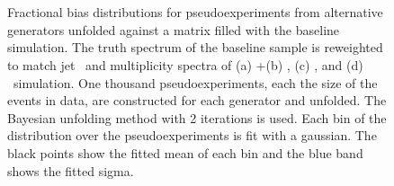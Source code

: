 \begin{figure}
~
\\
~
~
\caption{Fractional bias distributions for pseudoexperiments from alternative generators unfolded against a matrix filled with the baseline simulation. The truth spectrum of the baseline sample is reweighted to match jet \pt\ and multiplicity spectra of (a) \pow+\hw (b) \madpy, (c) \hdamp, and (d) \mcnlohw~simulation. One thousand pseudoexperiments, each the size of the events in data, are constructed for each generator and unfolded. The Bayesian unfolding method with 2 iterations is used. Each bin of the distribution over the pseudoexperiments is fit with a gaussian. The black points show the fitted mean of each bin and the blue band shows the fitted sigma.}
\label{fig:fracbias}
\end{figure}
